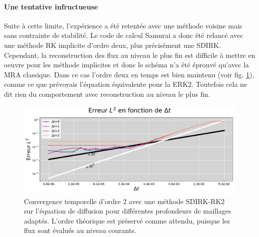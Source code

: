     \paragraph{Une tentative infructueuse}
        Suite à cette limite, l'expérience a été retentée avec une méthode voisine mais sans contrainte de stabilité. 
        Le code de calcul Samurai a donc été relancé avec une méthode RK implicite d'ordre deux, plus précisément une SDIRK.
        Cependant, la reconstruction des flux au niveau le plus fin est difficile à mettre en oeuvre pour les méthode implicites et donc
        le schéma n'a été éprouvé qu'avec la MRA classique. Dans ce cas l'ordre deux en temps est bien maintenu (voir fig. \ref{fig:convergence_sdirk}), comme ce que prévoyais l'équation équivalente 
        pour la ERK2. Toutefois cela ne dit rien du comportement avec reconstruction au niveau le plus fin.
        \begin{figure}[htbp]
            \centering
            \includegraphics[width=\textwidth]{media/4_travail/1_AMR/convergence/convergence_temps_SDIRK_ORDRE2.pdf}
            \caption{Convergence temporelle d'ordre 2 avec une méthode SDIRK-RK2 sur l'équation de diffusion pour différentes profondeurs de maillages adaptés.
                        L'ordre théorique est préservé comme attendu, puisque les flux sont évalués au niveau courants.}
            \label{fig:convergence_sdirk}
        \end{figure}
